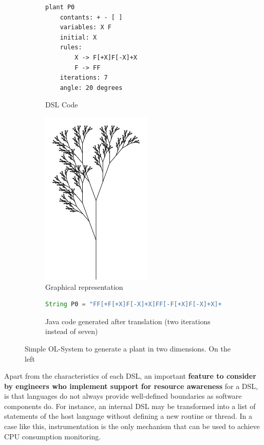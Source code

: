 \begin{figure}[ht]
\begin{mdframed}
\begin{subfigure}{0.45\textwidth}
\begin{lstlisting}[style={OL-systems}]
plant P0
	contants: + - [ ]
	variables: X F
	initial: X
	rules:
		X -> F[+X]F[-X]+X
		F -> FF
	iterations: 7
	angle: 20 degrees
\end{lstlisting}
\caption{DSL Code}\label{fig:l-system-code}
\end{subfigure}
\hspace{0.6cm}
\begin{subfigure}{0.45\textwidth}
\centering
\includegraphics[scale=0.35]{./chapter2/fig/plant.png}
\caption{Graphical representation}\label{fig:plant}
\end{subfigure}
\hspace{2.6cm}
\begin{subfigure} {\linewidth}\centering
\begin{lstlisting}[language=java, basicstyle=\footnotesize, stringstyle=\footnotesize\color{green!70!black}]
String P0 = "FF[+F[+X]F[-X]+X]FF[-F[+X]F[-X]+X]+F[+X]F[-X]+X";
\end{lstlisting}
\caption{Java code generated after translation (two iterations instead of seven)}\label{fig:l-system-generated}
\end{subfigure}
\end{mdframed}
\caption{Simple OL-System to generate a plant in two dimensions. On the left} \label{lst:OL-system-example}
\end{figure}

Apart from the characteristics of each DSL, an important \textbf{feature to consider by engineers who implement support for resource awareness} for a DSL,
is that languages do not always provide well-defined boundaries as software components do.
For instance, an internal DSL may be transformed into a list of statements of the host language without defining a new routine or thread.
In a case like this, instrumentation is the only mechanism that can be used to achieve CPU consumption monitoring.

